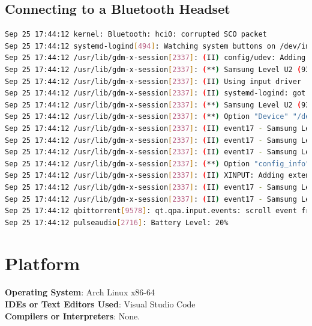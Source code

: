 \documentclass[11pt]{article}
\begin{document}
\subsection{Connecting to a Bluetooth Headset}

\begin{lstlisting}[language=bash]
Sep 25 17:44:12 kernel: Bluetooth: hci0: corrupted SCO packet
Sep 25 17:44:12 systemd-logind[494]: Watching system buttons on /dev/input/event17 (Samsung Level U2 (9304) (AVRCP))
Sep 25 17:44:12 /usr/lib/gdm-x-session[2337]: (II) config/udev: Adding input device Samsung Level U2 (9304) (AVRCP) (/dev/input/event17)
Sep 25 17:44:12 /usr/lib/gdm-x-session[2337]: (**) Samsung Level U2 (9304) (AVRCP): Applying InputClass "libinput keyboard catchall"
Sep 25 17:44:12 /usr/lib/gdm-x-session[2337]: (II) Using input driver 'libinput' for 'Samsung Level U2 (9304) (AVRCP)'
Sep 25 17:44:12 /usr/lib/gdm-x-session[2337]: (II) systemd-logind: got fd for /dev/input/event17 13:81 fd 144 paused 0
Sep 25 17:44:12 /usr/lib/gdm-x-session[2337]: (**) Samsung Level U2 (9304) (AVRCP): always reports core events
Sep 25 17:44:12 /usr/lib/gdm-x-session[2337]: (**) Option "Device" "/dev/input/event17"
Sep 25 17:44:12 /usr/lib/gdm-x-session[2337]: (II) event17 - Samsung Level U2 (9304) (AVRCP): is tagged by udev as: Keyboard
Sep 25 17:44:12 /usr/lib/gdm-x-session[2337]: (II) event17 - Samsung Level U2 (9304) (AVRCP): device is a keyboard
Sep 25 17:44:12 /usr/lib/gdm-x-session[2337]: (II) event17 - Samsung Level U2 (9304) (AVRCP): device removed
Sep 25 17:44:12 /usr/lib/gdm-x-session[2337]: (**) Option "config_info" "udev:/sys/devices/virtual/input/input44/event17"
Sep 25 17:44:12 /usr/lib/gdm-x-session[2337]: (II) XINPUT: Adding extended input device "Samsung Level U2 (9304) (AVRCP)" (type: KEYBOARD, id 18)
Sep 25 17:44:12 /usr/lib/gdm-x-session[2337]: (II) event17 - Samsung Level U2 (9304) (AVRCP): is tagged by udev as: Keyboard
Sep 25 17:44:12 /usr/lib/gdm-x-session[2337]: (II) event17 - Samsung Level U2 (9304) (AVRCP): device is a keyboard
Sep 25 17:44:12 qbittorrent[9578]: qt.qpa.input.events: scroll event from unregistered device 12
Sep 25 17:44:12 pulseaudio[2716]: Battery Level: 20%
\end{lstlisting}


\section{Platform}
\textbf{Operating System}: Arch Linux x86-64 \\
\textbf{IDEs or Text Editors Used}: Visual Studio Code\\
\textbf{Compilers or Interpreters}: None.\\
\end{document}

